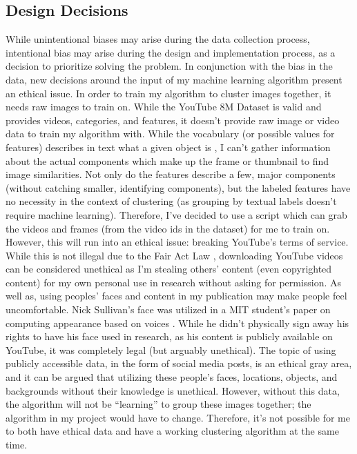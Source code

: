 \documentclass[10pt,twocolumn]{article}
\begin{document}
\subsection {Design Decisions}

While unintentional biases may arise during the data collection process, intentional bias may arise during the design and implementation process, as a decision to prioritize solving the problem. In conjunction with the bias in the data, new decisions around the input of my machine learning algorithm present an ethical issue. In order to train my algorithm to cluster images together, it needs raw images to train on. While the YouTube 8M Dataset is valid and provides videos, categories, and features, it doesn’t provide raw image or video data to train my algorithm with. While the vocabulary (or possible values for features) describes in text what a given object is \cite{googleYT8M}, I can’t gather information about the actual components which make up the frame or thumbnail to find image similarities. Not only do the features describe a few, major components (without catching smaller, identifying components), but the labeled features have no necessity in the context of clustering (as grouping by textual labels doesn’t require machine learning). Therefore, I’ve decided to use a script which can grab the videos and frames (from the video ids in the dataset) for me to train on. However, this will run into an ethical issue: breaking YouTube’s terms of service. While this is not illegal due to the Fair Act Law \cite{YTFairUse}, downloading YouTube videos can be considered unethical as I’m stealing others’ content (even copyrighted content) for my own personal use in research without asking for permission. As well as, using peoples’ faces and content in my publication may make people feel uncomfortable. Nick Sullivan’s face was utilized in a MIT student’s paper on computing appearance based on voices \cite{Hu2019}. While he didn’t physically sign away his rights to have his face used in research, as his content is publicly available on YouTube, it was completely legal (but arguably unethical). The topic of using publicly accessible data, in the form of social media posts, is an ethical gray area, and it can be argued that utilizing these people’s faces, locations, objects, and backgrounds without their knowledge is unethical. However, without this data, the algorithm will not be “learning” to group these images together; the algorithm in my project would have to change. Therefore, it’s not possible for me to both have ethical data and have a working clustering algorithm at the same time.
\end{document}
